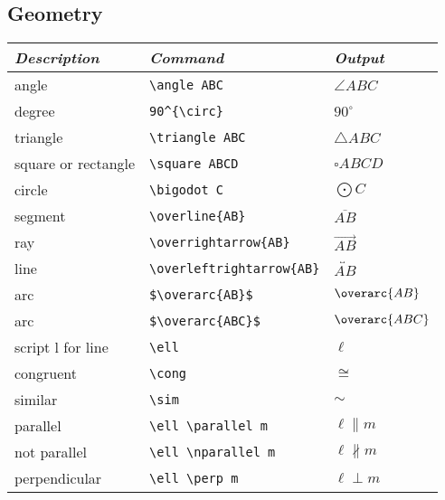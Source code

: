 \documentclass[12pt]{article}
\theoremstyle{definition}
\begin{document}
\subsection{Geometry}
\renewcommand{\arraystretch}{1.5} %
\begin{tabular}{| l | l | l |} \hline
\textit{Description} & \textit{Command} & \textit{Output}\\ \hline
angle& \verb!\angle ABC! & $\angle ABC$\\ \hline
degree& \verb!90^{\circ}! & $90^{\circ}$\\ \hline
triangle& \verb!\triangle ABC! & $\triangle ABC$\\ \hline
square or rectangle& \verb!\square ABCD! & $\square ABCD$\\ \hline
circle & \verb!\bigodot C! &$\bigodot C$\\ \hline
segment& \verb!\overline{AB}! & $\overline{AB}$\\ \hline
ray & \verb!\overrightarrow{AB}! & $\overrightarrow{AB}$ \\ \hline
line & \verb!\overleftrightarrow{AB}! &$\overleftrightarrow{AB}$ \\ \hline
arc &\verb!$\overarc{AB}$ ! &$\overarc{AB}$ \\ \hline%
arc &\verb!$\overarc{ABC}$ ! &$\overarc{ABC}$ \\ \hline %
script l for line & \verb!\ell! & $\ell$ \\ \hline
congruent& \verb!\cong! & $\cong$\\ \hline
similar & \verb!\sim! & $\sim$ \\ \hline
parallel & \verb!\ell \parallel m! & $\ell \parallel m$\\ \hline
not parallel & \verb!\ell \nparallel m! & $\ell \nparallel m$\\ \hline
perpendicular & \verb!\ell \perp m! & $\ell \perp m$\\ \hline
\end{tabular}
\\
\end{document}
